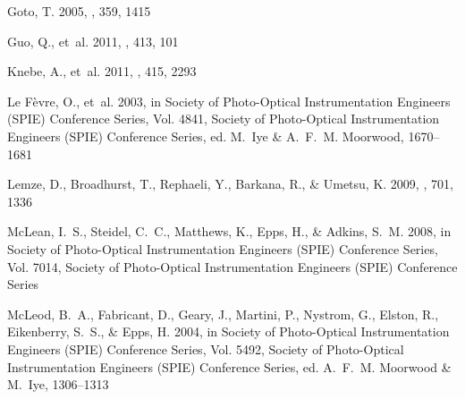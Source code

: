 \documentclass[iop]{emulateapj}
\begin{document}
\begin{thebibliography}{42}
{Goto}, T. 2005, \mnras, 359, 1415

{Guo}, Q., {et~al.} 2011, \mnras, 413, 101

{Knebe}, A., {et~al.} 2011, \mnras, 415, 2293

{Le F{\`e}vre}, O., {et~al.} 2003, in Society of Photo-Optical Instrumentation
  Engineers (SPIE) Conference Series, Vol. 4841, Society of Photo-Optical
  Instrumentation Engineers (SPIE) Conference Series, ed. M.~{Iye} \& A.~F.~M.
  {Moorwood}, 1670--1681
  
{Lemze}, D., {Broadhurst}, T., {Rephaeli}, Y., {Barkana}, R., \& {Umetsu}, K.
  2009, \apj, 701, 1336

{McLean}, I.~S., {Steidel}, C.~C., {Matthews}, K., {Epps}, H., \& {Adkins},
  S.~M. 2008, in Society of Photo-Optical Instrumentation Engineers (SPIE)
  Conference Series, Vol. 7014, Society of Photo-Optical Instrumentation
  Engineers (SPIE) Conference Series

{McLeod}, B.~A., {Fabricant}, D., {Geary}, J., {Martini}, P., {Nystrom}, G.,
  {Elston}, R., {Eikenberry}, S.~S., \& {Epps}, H. 2004, in Society of
  Photo-Optical Instrumentation Engineers (SPIE) Conference Series, Vol. 5492,
  Society of Photo-Optical Instrumentation Engineers (SPIE) Conference Series,
  ed. A.~F.~M. {Moorwood} \& M.~{Iye}, 1306--1313


\end{thebibliography}
\end{document}
